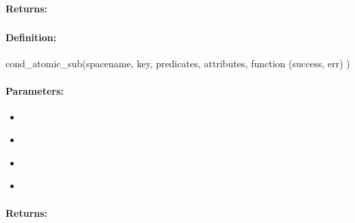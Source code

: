 \paragraph{Returns:}


\pagebreak
\subsubsection{}
\label{api:nodejs:cond_atomic_sub}


\paragraph{Definition:}
\begin{javascriptcode}
cond_atomic_sub(spacename, key, predicates, attributes, function (success, err) {})
\end{javascriptcode}
\paragraph{Parameters:}
\begin{itemize}[noitemsep]
\item {}\\

\item {}\\

\item {}\\

\item {}\\

\end{itemize}

\paragraph{Returns:}


\pagebreak
\subsubsection{}
\label{api:nodejs:group_atomic_sub}


